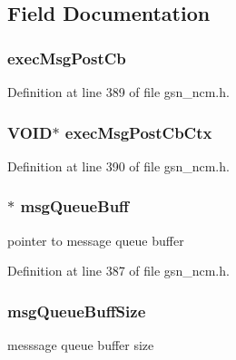 \subsection{Field Documentation}
\hypertarget{a00159_a5603e3f15c0a3cf1d8b11f8d09853a34}{
\subsubsection[{execMsgPostCb}]{ {\bf execMsgPostCb}}}
\label{a00159_a5603e3f15c0a3cf1d8b11f8d09853a34}


Definition at line 389 of file gsn\_\-ncm.h.

\hypertarget{a00159_aa13ea63dd76c4df311eda6a811d384f5}{
\subsubsection[{execMsgPostCbCtx}]{\setlength{\rightskip}{0pt plus 5cm}VOID$\ast$ {\bf execMsgPostCbCtx}}}
\label{a00159_aa13ea63dd76c4df311eda6a811d384f5}


Definition at line 390 of file gsn\_\-ncm.h.

\hypertarget{a00159_a7e51f5f5131592004e739bcc100a27fc}{
\subsubsection[{msgQueueBuff}]{$\ast$ {\bf msgQueueBuff}}}
\label{a00159_a7e51f5f5131592004e739bcc100a27fc}
pointer to message queue buffer 

Definition at line 387 of file gsn\_\-ncm.h.

\hypertarget{a00159_a21640f5a1df0caa651f4ffe4280d6210}{
\subsubsection[{msgQueueBuffSize}]{ {\bf msgQueueBuffSize}}}
\label{a00159_a21640f5a1df0caa651f4ffe4280d6210}
messsage queue buffer size 


